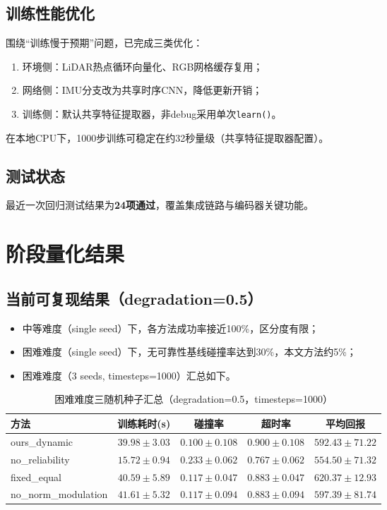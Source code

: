 \subsection{训练性能优化}
围绕“训练慢于预期”问题，已完成三类优化：
\begin{enumerate}
    \item 环境侧：LiDAR热点循环向量化、RGB网格缓存复用；
    \item 网络侧：IMU分支改为共享时序CNN，降低更新开销；
    \item 训练侧：默认共享特征提取器，非debug采用单次\texttt{learn()}。
\end{enumerate}
在本地CPU下，1000步训练可稳定在约32秒量级（共享特征提取器配置）。

\subsection{测试状态}
最近一次回归测试结果为\textbf{24项通过}，覆盖集成链路与编码器关键功能。

\section{阶段量化结果}
\subsection{当前可复现结果（degradation=0.5）}
\begin{itemize}
    \item 中等难度（single seed）下，各方法成功率接近100\%，区分度有限；
    \item 困难难度（single seed）下，无可靠性基线碰撞率达到30\%，本文方法约5\%；
    \item 困难难度（3 seeds, timesteps=1000）汇总如下。
\end{itemize}

\begin{table}[h!]
    \centering
    \caption{困难难度三随机种子汇总（degradation=0.5，timesteps=1000）}
    \label{tab-progress-hard-ms}
    \begin{tabular}{lcccc}
        \toprule
        方法 & 训练耗时(s) & 碰撞率 & 超时率 & 平均回报 \\
        \midrule
        ours\_dynamic & $39.98 \pm 3.03$ & $0.100 \pm 0.108$ & $0.900 \pm 0.108$ & $592.43 \pm 71.22$ \\
        no\_reliability & $15.72 \pm 0.94$ & $0.233 \pm 0.062$ & $0.767 \pm 0.062$ & $554.50 \pm 71.32$ \\
        fixed\_equal & $40.59 \pm 5.89$ & $0.117 \pm 0.047$ & $0.883 \pm 0.047$ & $620.37 \pm 12.93$ \\
        no\_norm\_modulation & $41.61 \pm 5.32$ & $0.117 \pm 0.094$ & $0.883 \pm 0.094$ & $597.39 \pm 81.74$ \\
        \bottomrule
    \end{tabular}
\end{table}

